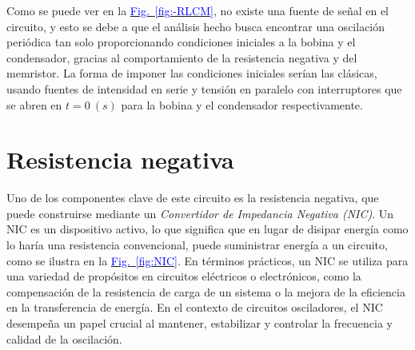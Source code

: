 \documentclass[12pt,a4paper]{report} %
\newcommand{\fref}[1]{\hyperref[#1]{\textcolor{blue}{Fig.~\ref*{#1}}}}
\newcommand{\fref}[1]{\hyperref[#1]{\textcolor{blue}{\textit{Fig.~\ref*{#1}}}}}
\begin{document}
	\vspace{0.5cm}Como se puede ver en la \fref{fig:-RLCM}, no existe una fuente de señal en el circuito, y esto se debe a que el análisis hecho busca encontrar una oscilación periódica tan solo proporcionando condiciones iniciales a la bobina y el condensador, gracias al comportamiento de la resistencia negativa y del memristor. La forma de imponer las condiciones iniciales serían las clásicas, usando fuentes de intensidad en serie y tensión en paralelo con interruptores que se abren en $t=0\:(s)$ para la bobina y el condensador respectivamente.
	
	\newpage
	
	\section{Resistencia negativa}
	
	 Uno de los componentes clave de este circuito es la resistencia negativa, que puede construirse mediante un \textit{Convertidor de Impedancia Negativa (NIC)}. Un NIC es un dispositivo activo, lo que significa que en lugar de disipar energía como lo haría una resistencia convencional, puede suministrar energía a un circuito, como se ilustra en la \fref{fig:NIC}. En términos prácticos, un NIC se utiliza para una variedad de propósitos en circuitos eléctricos o electrónicos, como la compensación de la resistencia de carga de un sistema o  la mejora de la eficiencia en la transferencia de energía. En el contexto de circuitos osciladores, el NIC desempeña un papel crucial al mantener, estabilizar y controlar la frecuencia y calidad de la oscilación.
	 
\end{document}
